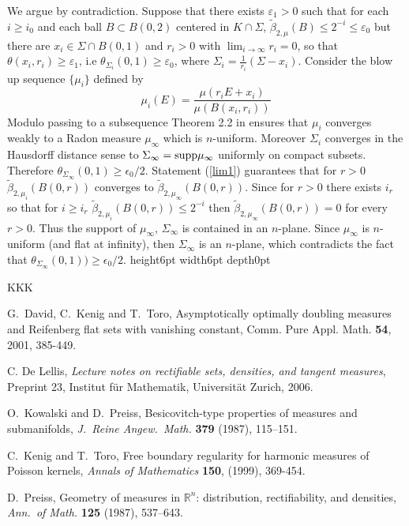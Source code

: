\documentclass[12pt,leqno]{article}
\newcommand\qed{\hfill\vrule height6pt width6pt depth0pt}
\newcommand{\supp}{{\rm supp}}
\newcommand{\wt}[1]{{\widetilde{#1}}}
\newcommand{\RR}{\mathbb{R}}
\newcommand{\ve}{{\varepsilon}}
\theoremstyle{plain}
\numberwithin{equation}{section}
\begin{document}
 We argue by contradiction.
Suppose that there exists $\ve_1>0$ such that for each $i\ge i_0$
and each ball $B\subset B(0,2)$ centered in $K\cap \Sigma$,
$\wt\beta_{2,\mu}(B)\le 2^{-i}\le \ve_0$ but there are
$x_i\in \Sigma\cap B(0,1)$ and $r_i>0$ with $\lim_{i\rightarrow \infty}r_i=0$,
so that $\theta(x_i,r_i)\ge \ve_1$, i.e $\theta_{\Sigma_i}(0,1)\ge\ve_0$,
where $\Sigma_i=\frac{1}{r_i}(\Sigma -x_i)$.
Consider the blow up sequence $\{\mu_i\}$ defined by
\begin{equation}\label{blowup}
\mu_i(E)=\frac{\mu(r_iE+x_i)}{\mu(B(x_i,r_i))}
\end{equation}
Modulo passing to a subsequence Theorem 2.2 in \cite{KT} ensures that
$\mu_i$ converges weakly to a Radon measure $\mu_\infty$ which is
$n$-uniform. Moreover
$\Sigma_i$ converges in the Hausdorff distance
sense to $\Sigma_\infty= \supp\mu_\infty$ uniformly on compact subsets.
Therefore $\theta_{\Sigma_\infty}(0,1)\ge \epsilon_0/2$.
Statement (\ref{lim1}) guarantees that for $r>0$
$\tilde \beta_{2,\mu_i}(B(0,r))$ converges to
$\tilde\beta_{2,\mu_\infty}(B(0,r))$. Since  for $r>0$ there exists
$i_r$ so that
for $i\ge i_r$
$\tilde \beta_{2,\mu_i}(B(0,r))\le 2^{-i}$ then
$\tilde\beta_{2,\mu_\infty}(B(0,r))=0$ for every $r>0$.
Thus the support of $\mu_\infty$, $\Sigma_\infty$ is contained in an $n$-plane.
Since $\mu_\infty$ is $n$-uniform (and flat at infinity),
then $\Sigma_\infty$ is an $n$-plane, which contradicts the fact that
$\theta_{\Sigma_\infty}(0,1))\ge \epsilon_0/2$. \qed





\begin{thebibliography}{KKK}


 G.\ David, C.\ Kenig and T.\ Toro, Asymptotically optimally
doubling measures and Reifenberg flat sets with vanishing constant,
Comm. Pure Appl. Math. {\bf 54}, 2001, 385-449.

 C. De Lellis, {\em Lecture notes on
rectifiable sets, densities, and tangent measures}, Preprint 23, Institut f\"ur Mathematik, Universit\"at Zurich, 2006.


O.\ Kowalski and D.\ Preiss, Besicovitch-type properties of
measures and submanifolds, \emph{J.\ Reine Angew.\ Math.} {\bf 379} (1987),
115--151.


C.\ Kenig and T.\ Toro, Free boundary regularity for
harmonic measures of Poisson kernels, \emph{Annals of
Mathematics} {\bf 150}, (1999), 369-454.


D.\ Preiss, Geometry of measures in $\RR^n$: distribution,
rectifiability, and densities, \emph{Ann.\ of Math.} {\bf 125} (1987),
537--643.

\end{thebibliography}
\end{document}
